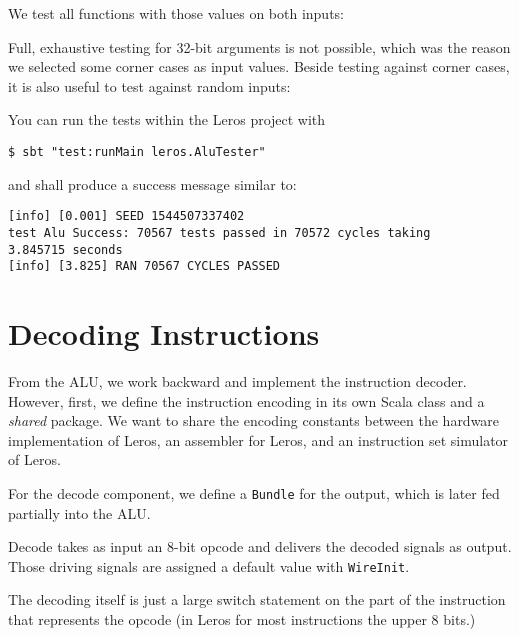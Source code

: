 \documentclass[%
    10pt,
    headinclude, footexclude,
    openright, %
    notitlepage,
    cleardoubleempty,
    headsepline,
    pointlessnumbers,
    bibtotoc, idxtotoc,
    ]{scrbook}
\newcommand{\code}[1]{{\small{\texttt{#1}}}}
\newcommand{\todo}[1]{{\emph{TODO: #1}}}
\renewcommand{\todo}[1]{}
\begin{document}
\noindent We test all functions with those values on both inputs:


\noindent Full, exhaustive testing for 32-bit arguments is not possible, which was the reason we
selected some corner cases as input values. Beside testing against corner cases, it is also useful
to test against random inputs:


\noindent You can run the tests within the Leros project with

\begin{verbatim}
$ sbt "test:runMain leros.AluTester"
\end{verbatim}

and shall produce a success message similar to:

\begin{verbatim}
[info] [0.001] SEED 1544507337402
test Alu Success: 70567 tests passed in 70572 cycles taking
3.845715 seconds
[info] [3.825] RAN 70567 CYCLES PASSED
\end{verbatim}

\section{Decoding Instructions}

From the ALU, we work backward and implement the instruction decoder.
However, first, we define the instruction encoding in its own Scala class and
a \emph{shared} package. We want to share the encoding constants between
the hardware implementation of Leros, an assembler for Leros, and an instruction
set simulator of Leros.


\todo{Update code when Leros is more complete, as stuff is missing.}

\noindent For the decode component, we define a \code{Bundle} for the output,
which is later fed partially into the ALU.


\noindent Decode takes as input an 8-bit opcode and delivers the decoded signals
as output. Those driving signals are assigned a default value with \code{WireInit}.


\noindent The decoding itself is just a large switch statement on the part of the
instruction that represents the opcode (in Leros for most instructions the upper
8 bits.)
\end{document}
